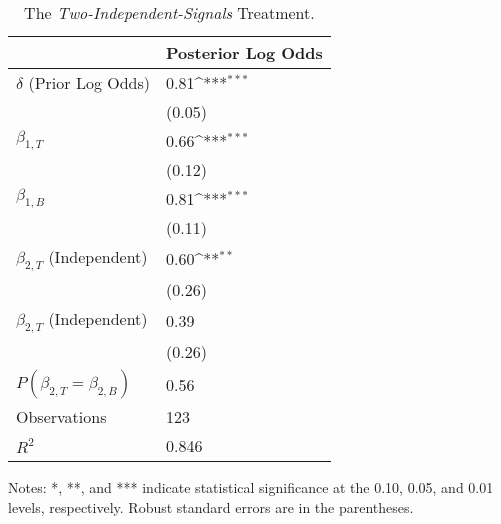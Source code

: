 \begin{table}[h]
\def\sym#1{\ifmmode^{#1}\else\(^{#1}\)\fi}
\begin{center}
\caption{The \textit{Two-Independent-Signals} Treatment.\label{table2}}
\vskip 2mm
\setlength\extrarowheight{-5pt}
\begin{tabular}{p{3.5cm} p{4cm}<{\centering}}
\toprule
 & \multicolumn{1}{c}{Posterior Log Odds} \\
\midrule
$\delta$ (Prior Log Odds)&        0.81\sym{***}\\
                         &      (0.05)         \\
\addlinespace
$\beta_{1, T}$           &        0.66\sym{***}\\
                         &      (0.12)         \\
\addlinespace
$\beta_{1, B}$           &        0.81\sym{***}\\
                         &      (0.11)         \\
\addlinespace
$\beta_{2, T}$ (Independent)&        0.60\sym{**} \\
                         &      (0.26)         \\
\addlinespace
$\beta_{2, T}$ (Independent)&        0.39         \\
                         &      (0.26)         \\
\midrule
$P(\beta_{2, T} = \beta_{2, B})$&        0.56         \\
Observations             &         123         \\
\(R^{2}\)                &       0.846         \\
\bottomrule
\end{tabular}
\end{center}
\footnotesize{Notes: *, **, and *** indicate statistical significance at the 0.10, 0.05, and 0.01 levels, respectively. Robust standard errors are in the parentheses.}
\end{table}
